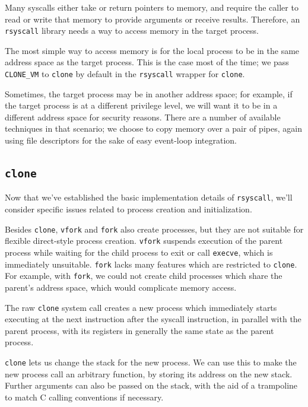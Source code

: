\documentclass[letterpaper,twocolumn,10pt]{article}
\begin{document}
Many syscalls either take or return pointers to memory,
and require the caller to read or write that memory to provide arguments or receive results.
Therefore, an \texttt{rsyscall} library needs a way to access memory in the target process.

The most simple way to access memory is for the local process to be in the same address space as the target process.
This is the case most of the time; we pass \verb|CLONE_VM| to \texttt{clone} by default
in the \texttt{rsyscall} wrapper for \texttt{clone}.

Sometimes, the target process may be in another address space;
for example, if the target process is at a different privilege level,
we will want it to be in a different address space for security reasons\cite{vfork_dangerous}.
There are a number of available techniques in that scenario;
we choose to copy memory over a pair of pipes,
again using file descriptors for the sake of easy event-loop integration.
\subsection{\texttt{clone}}\label{clone}
Now that we've established the basic implementation details of \texttt{rsyscall},
we'll consider specific issues related to process creation and initialization.

Besides \texttt{clone}, \texttt{vfork} and \texttt{fork} also create processes,
but they are not suitable for flexible direct-style process creation.
\texttt{vfork} suspends execution of the parent process
while waiting for the child process to exit or call \texttt{execve},
which is immediately unsuitable\cite{vfork}.
\texttt{fork} lacks many features which are restricted to \texttt{clone}.
For example, with \texttt{fork},
we could not create child processes which share the parent's address space,
which would complicate memory access.

The raw \texttt{clone} system call creates a new process
which immediately starts executing at the next instruction after the syscall instruction,
in parallel with the parent process,
with its registers in generally the same state as the parent process.

\texttt{clone} lets us change the stack for the new process.
We can use this to make the new process call an arbitrary function,
by storing its address on the new stack.
Further arguments can also be passed on the stack,
with the aid of a trampoline to match C calling conventions if necessary.
\end{document}
